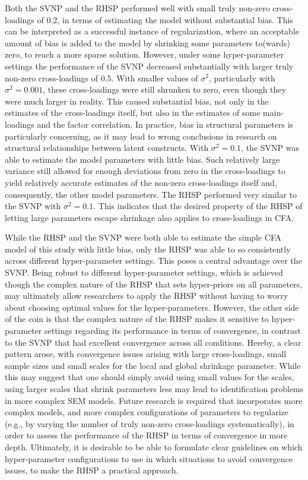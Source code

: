 \documentclass[
  man, donotrepeattitle,floatsintext]{apa6}
\begin{document}
Both the SVNP and the RHSP performed well with small truly non-zero cross-loadings of 0.2, in terms of estimating the model without substantial bias. This can be interpreted as a successful instance of regularization, where an acceptable amount of bias is added to the model by shrinking some parameters to(wards) zero, to reach a more sparse solution. However, under some hyper-parameter settings the performance of the SVNP decreased substantially with larger truly non-zero cross-loadings of 0.5. With smaller values of \(\sigma^2\), particularly with \(\sigma^2 = 0.001\), these cross-loadings were still shrunken to zero, even though they were much larger in reality. This caused substantial bias, not only in the estimates of the cross-loadings itself, but also in the estimates of some main-loadings and the factor correlation. In practice, bias in structural parameters is particularly concerning, as it may lead to wrong conclusions in research on structural relationships between latent constructs. With \(\sigma^2 = 0.1\), the SVNP was able to estimate the model parameters with little bias. Such relatively large variance still allowed for enough deviations from zero in the cross-loadings to yield relatively accurate estimates of the non-zero cross-loadings itself and, consequently, the other model parameters. The RHSP performed very similar to the SVNP with \(\sigma^2 = 0.1\). This indicates that the desired property of the RHSP of letting large parameters escape shrinkage also applies to cross-loadings in CFA.

While the RHSP and the SVNP were both able to estimate the simple CFA model of this study with little bias, only the RHSP was able to so consistently across different hyper-parameter settings. This poses a central advantage over the SVNP. Being robust to different hyper-parameter settings, which is achieved though the complex nature of the RHSP that sets hyper-priors on all parameters, may ultimately allow researchers to apply the RHSP without having to worry about choosing optimal values for the hyper-parameters. However, the other side of the coin is that the complex nature of the RHSP makes it sensitive to hyper-parameter settings regarding its performance in terms of convergence, in contrast to the SVNP that had excellent convergence across all conditions. Hereby, a clear pattern arose, with convergence issues arising with large cross-loadings, small sample sizes and small scales for the local and global shrinkage parameter. While this may suggest that one should simply avoid using small values for the scales, using larger scales that shrink parameters less may lead to identification problems in more complex SEM models. Future research is required that incorporates more complex models, and more complex configurations of parameters to regularize (e.g., by varying the number of truly non-zero cross-loadings systematically), in order to assess the performance of the RHSP in terms of convergence in more depth. Ultimately, it is desirable to be able to formulate clear guidelines on which hyper-parameter configurations to use in which situations to avoid convergence issues, to make the RHSP a practical approach.
\end{document}

